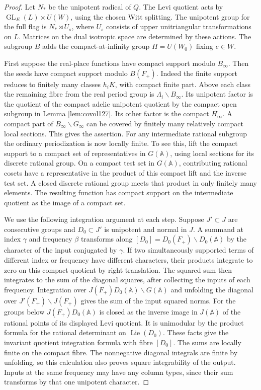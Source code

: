 \documentclass[a4paper,11pt]{article}
\theoremstyle{definition}
\theoremstyle{remark}
\numberwithin{equation}{section}
\begin{document}
\begin{proof}
Let \(N_*\) be the unipotent radical of \(Q\).
The Levi quotient acts by
\(\operatorname{GL}_E(L)\times U(W)\), using the chosen Witt splitting. The
unipotent group for the full flag is \(N_*\rtimes U_s\), where
\(U_s\) consists of upper unitriangular transformations on \(L\).
Matrices on the dual isotropic space are determined by these
actions. The subgroup \(B\) adds the compact-at-infinity group
\(H=U(W_0)\) fixing \(e\in W\).

First suppose the real-place functions have compact support
modulo \(B_\infty\). Then the seeds have compact support modulo
\(B(F_+)\). Indeed the finite support reduces to finitely many
classes \(h_iK\), with compact finite part. Above each class the
remaining fibre from the real period group is
\(\Lambda_i\backslash B_\infty\). Its unipotent factor is the
quotient of the compact adelic unipotent quotient by the compact
open subgroup in Lemma \ref{lem:covol127}. Its other factor is the
compact \(H_\infty\).
A compact part of \(B_\infty\backslash G_\infty\) can be covered
by finitely many relatively compact local sections. This gives
the assertion. For any intermediate rational subgroup the ordinary
periodization is now locally finite. To see this, lift the compact
support to a compact set of representatives in \(G(\mathbb A)\),
using local sections for its discrete rational group. On a compact
test set in \(G(\mathbb A)\), contributing rational cosets have a
representative in the product of this compact lift and the inverse
test set. A closed discrete rational group meets that product in
only finitely many elements. The resulting function has compact
support on the intermediate quotient as the image of a compact set.

We use the following integration argument at each step. Suppose
\(J'\subset J\) are consecutive groups and \(D_0\subset J'\) is
unipotent and normal in \(J\). A summand at index \(\gamma\)
and frequency \(\beta\) transforms along
\([D_0]=D_0(F_+)\backslash D_0(\mathbb A)\) by the character of
the input conjugated by \(\gamma\). If two simultaneously supported
terms of different index or frequency have different characters,
their products integrate to zero on this compact quotient by
right translation. The squared sum then integrates to the sum of
the diagonal squares, after collecting the inputs of each frequency.
Integration over \(J(F_+)D_0(\mathbb A)\backslash G(\mathbb A)\)
and unfolding the diagonal over \(J'(F_+)\backslash J(F_+)\)
gives the sum of the input squared norms. For the groups below
\(J(F_+)D_0(\mathbb A)\) is closed as the inverse image in
\(J(\mathbb A)\) of the rational points of its displayed Levi
quotient. It is unimodular by the product formula for the rational
determinant on \(\operatorname{Lie}(D_0)\). These facts give the
invariant quotient integration formula with fibre \([D_0]\).
The sums are locally finite on the compact fibre. The nonnegative
diagonal integrals are finite by unfolding, so this calculation
also proves square integrability of the output. Inputs at the same
frequency may have any column types, since their sum transforms by
that one unipotent character.


\end{proof}
\end{document}
